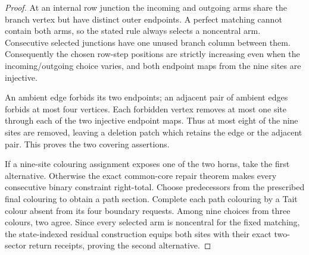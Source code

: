 \begin{proof}
At an internal row junction the incoming and outgoing arms share the branch
vertex but have distinct outer endpoints.  A perfect matching cannot contain
both arms, so the stated rule always selects a noncentral arm.  Consecutive
selected junctions have one unused branch column between them.  Consequently
the chosen row-step positions are strictly increasing even when the
incoming/outgoing choice varies, and both endpoint maps from the nine sites
are injective.

An ambient edge forbids its two endpoints; an adjacent pair of ambient edges
forbids at most four vertices.  Each forbidden vertex removes at most one
site through each of the two injective endpoint maps.  Thus at most eight of
the nine sites are removed, leaving a deletion patch which retains the edge
or the adjacent pair.  This proves the two covering assertions.

If a nine-site colouring assignment exposes one of the two horns, take the
first alternative.  Otherwise the exact common-core repair theorem makes
every consecutive binary constraint right-total.  Choose predecessors from
the prescribed final colouring to obtain a path section.  Complete each path
colouring by a Tait colour absent from its four boundary requests.  Among nine
choices from three colours, two agree.  Since every selected arm is
noncentral for the fixed matching, the state-indexed residual construction
equips both sites with their exact two-sector return receipts, proving the
second alternative.
\end{proof}

